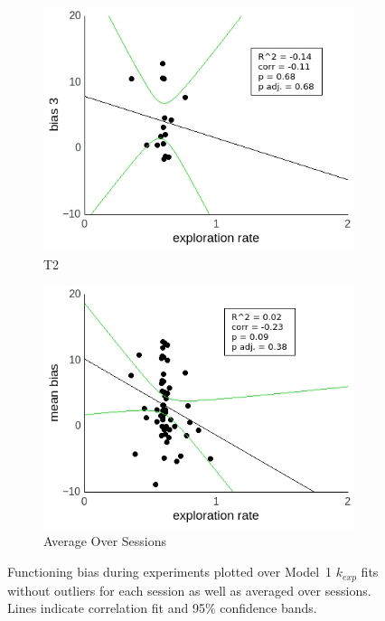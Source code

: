 \documentclass[a4paper]{scrreprt}
\begin{document}
\begin{figure}
\begin{subfigure}[b]{0.49\textwidth}
        \includegraphics[width=\textwidth]{figs/sec3/temp/tempno_diff_3_mod1dat.jpeg}
        \caption{T2}
    \end{subfigure}
    \begin{subfigure}[b]{0.49\textwidth}
        \includegraphics[width=\textwidth]{figs/sec3/temp/tempno_diff_mean_mod1dat.jpeg}
        \caption{Average Over Sessions}
    \end{subfigure}
\caption{Functioning bias during experiments plotted over Model~1 $k_{exp}$ fits without outliers for each session as well as averaged over sessions. Lines indicate correlation fit and 95\% confidence bands.}
\label{fig:tempno_diff_mod1dat}
\end{figure}
\end{document}
